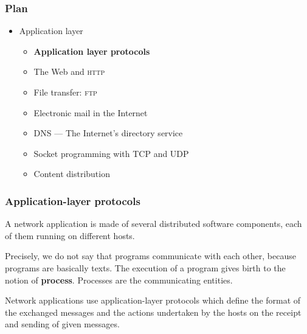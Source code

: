 %
\begin{frame}
\frametitle{Plan}

\begin{itemize}

  \item Application layer

  \begin{itemize}

    \item \textbf{Application layer protocols}

    \item The Web and \textsc{http}

    \item File transfer: \textsc{ftp}

    \item Electronic mail in the Internet

    \item DNS --- The Internet's directory service

    \item Socket programming with TCP and UDP

    \item Content distribution

  \end{itemize}

\end{itemize}

\end{frame}

%
\begin{frame}
\frametitle{Application-layer protocols}

A network application is made of several distributed software
components, each of them running on different hosts.

\bigskip

Precisely, we do not say that programs communicate with each other,
because programs are basically texts. The execution of a program
gives birth to the notion of \textbf{process}. Processes are the
communicating entities.

\bigskip

Network applications use application-layer protocols which define the
format of the exchanged messages and the actions undertaken by the
hosts on the receipt and sending of given messages.

\end{frame}

